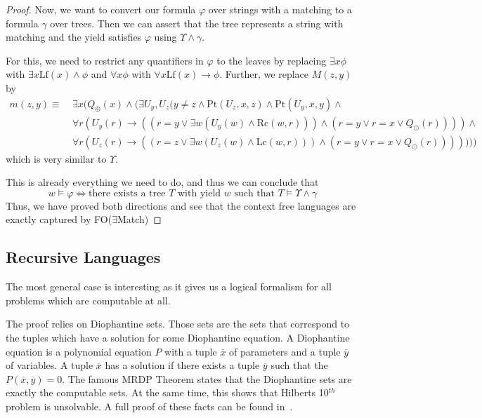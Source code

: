 \begin{proof}
    Now, we want to convert our formula $\varphi$ over strings with a matching to a formula $\gamma$ over trees.
    Then we can assert that the tree represents a string with matching and the yield satisfies $\varphi$ using $\Upsilon \land \gamma$.

    For this, we need to restrict any quantifiers in $\varphi$ to the leaves by replacing $\exists x \phi$ with $\exists x \text{Lf}(x) \land \phi$ and $\forall x \phi$ with $\forall x \text{Lf}(x) \to \phi$.
    Further, we replace $M(z, y)$ by
    \begin{align*}
        m(z, y) \equiv~& \exists x ( Q_{\oplus}(x) \land ( \exists U_y, U_z (y \neq z \land \text{Pt}(U_z, x, z) \land \text{Pt}(U_y, x, y) \land \\
        &\forall r (U_y(r) \to ((r = y \lor \exists w (U_y(w) \land \text{Rc}(w, r)))\land (r = y \lor r = x \lor Q_{\odot}(r)))) \land \\
        &\forall r (U_z(r) \to ((r = z \lor \exists w (U_z(w) \land \text{Lc}(w, r)))\land (r = y \lor r = x \lor Q_{\odot}(r)))))))
    \end{align*}
    which is very similar to $\Upsilon$.

    This is already everything we need to do, and thus we can conclude that
    \[w \models \varphi \Leftrightarrow \text{there exists a tree $T$ with yield $w$ such that } T \models \Upsilon \land \gamma \]
    Thus, we have proved both directions and see that the context free languages are exactly captured by FO($\exists$Match)
\end{proof}

\subsection{Recursive Languages}\label{subsec:des-recursive-languages}

The most general case is interesting as it gives us a logical formalism for all problems which are computable at all.

The proof relies on Diophantine sets.
Those sets are the sets that correspond to the tuples which have a solution for some Diophantine equation.
A Diophantine equation is a polynomial equation $P$ with a tuple $\overline{x}$ of parameters and a tuple $\overline{y}$ of variables.
A tuple $\overline{x}$ has a solution if there exists a tuple $\overline{y}$ such that the $P(\overline{x}, \overline{y}) = 0$.
The famous MRDP Theorem states that the Diophantine sets are exactly the computable sets.
At the same time, this shows that Hilberts 10$^{th}$ problem is unsolvable.
A full proof of these facts can be found in~\cite{Matijasevic1996}.

